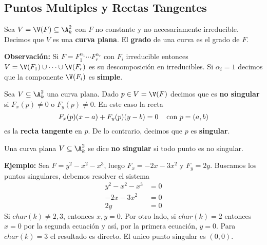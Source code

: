 \documentclass{article}
\begin{document}
\subsection{Puntos Multiples y Rectas Tangentes}
\begin{dfn}
    Sea $V=\V(F)\subseteq\A_{k}^{2}$ con $F$ no constante y no necesariamente irreducible. Decimos
    que $V$ es una \textbf{curva plana}. El \textbf{grado} de una curva es el grado de $F$.
\end{dfn}
\noindent\textbf{Observación:} Si $F=F_{1}^{\alpha_{1}}\cdots F_{r}^{\alpha_{r}}$ con $F_{i}$ 
irreducible entonces $V=\V(F_{1})\cup\cdots\cup\V(F_{r})$ es su descomposición en irreducibles.
Si $\alpha_{i}=1$ decimos que la componente $\V(F_{i})$ es \textbf{simple}.
\begin{dfn}
    Sea $V\subseteq\A_{k}^{2}$ una curva plana. Dado $p\in V=\V(F)$ decimos que es 
    \textbf{no singular} si $F_{x}(p)\neq0$ o $F_{y}(p)\neq0$. En este caso la recta
    \begin{equation*}
        F_{x}(p)(x-a)+F_{y}(p)(y-b)=0\hspace{4mm}\text{con }p=(a,b)
    \end{equation*}
    es la \textbf{recta tangente} en $p$. De lo contrario, decimos que $p$ es \textbf{singular}.
\end{dfn}
\begin{dfn}
    Una curva plana $V\subseteq\A_{k}^{2}$ se dice \textbf{no singular} si todo punto es no 
    singular.
\end{dfn}

\noindent\textbf{Ejemplo:} Sea $F=y^{2}-x^{2}-x^{3}$, luego $F_{x}=-2x-3x^{2}$ y $F_{y}=2y$.
Buscamos los puntos singulares, debemos resolver el sistema
\begin{align*}
    y^{2}-x^{2}-x^{3} &= 0 \\
    -2x-3x^{2} &= 0 \\
    2y &= 0
\end{align*}
Si $char(k)\neq2,3$, entonces $x,y=0$. Por otro lado, si $char(k)=2$ entonces $x=0$ por la segunda
ecuación y así, por la primera ecuación, $y=0$. Para $char(k)=3$ el resultado es directo. El unico
punto singular es $(0,0)$.
\end{document}
